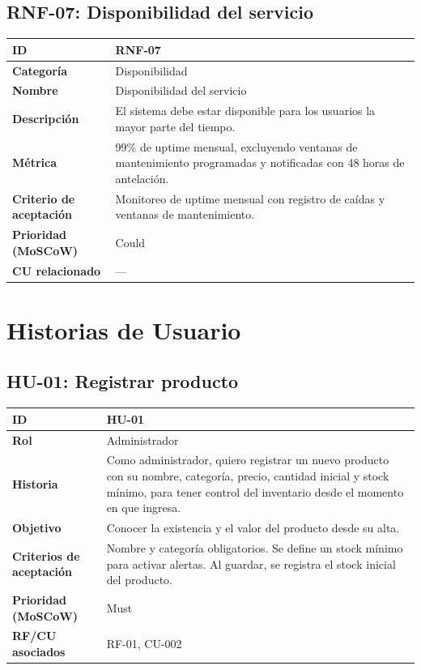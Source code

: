 \documentclass[12pt, a4paper]{article}
\begin{document}
\subsection{RNF-07: Disponibilidad del servicio}
\begin{center}
\renewcommand{\arraystretch}{1.4}
\begin{tabular}{|L{4cm}|L{12cm}|}
\hline
\textbf{ID} & RNF-07 \\
\hline
\textbf{Categoría} & Disponibilidad \\
\hline
\textbf{Nombre} & Disponibilidad del servicio \\
\hline
\textbf{Descripción} & El sistema debe estar disponible para los usuarios la mayor parte del tiempo. \\
\hline
\textbf{Métrica} & 99\% de uptime mensual, excluyendo ventanas de mantenimiento programadas y notificadas con 48 horas de antelación. \\
\hline
\textbf{Criterio de aceptación} & Monitoreo de uptime mensual con registro de caídas y ventanas de mantenimiento. \\
\hline
\textbf{Prioridad (MoSCoW)} & Could \\
\hline
\textbf{CU relacionado} & --- \\
\hline
\end{tabular}
\end{center}

\newpage

\section{Historias de Usuario}

\subsection{HU-01: Registrar producto}
\begin{center}
\renewcommand{\arraystretch}{1.4}
\begin{tabular}{|L{4cm}|L{12cm}|}
\hline
\textbf{ID} & HU-01 \\
\hline
\textbf{Rol} & Administrador \\
\hline
\textbf{Historia} & Como administrador, quiero registrar un nuevo producto con su nombre, categoría, precio, cantidad inicial y stock mínimo, para tener control del inventario desde el momento en que ingresa. \\
\hline
\textbf{Objetivo} & Conocer la existencia y el valor del producto desde su alta. \\
\hline
\textbf{Criterios de aceptación} & Nombre y categoría obligatorios. Se define un stock mínimo para activar alertas. Al guardar, se registra el stock inicial del producto. \\
\hline
\textbf{Prioridad (MoSCoW)} & Must \\
\hline
\textbf{RF/CU asociados} & RF-01, CU-002 \\
\hline
\end{tabular}
\end{center}
\end{document}
